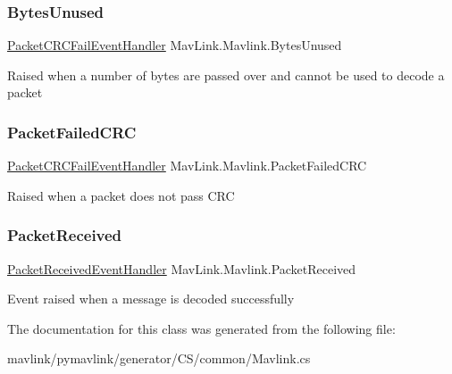 \subsubsection{\texorpdfstring{Bytes\+Unused}{BytesUnused}}
{\footnotesize\ttfamily \hyperlink{namespaceMavLink_a8ed8a6701876b63e5bb9135a9897d679}{Packet\+C\+R\+C\+Fail\+Event\+Handler} Mav\+Link.\+Mavlink.\+Bytes\+Unused}



Raised when a number of bytes are passed over and cannot be used to decode a packet 

\mbox{\label{classMavLink_1_1Mavlink_ac73a6b5c5f3ecd09964ec630225fabdd}} 
\subsubsection{\texorpdfstring{Packet\+Failed\+C\+RC}{PacketFailedCRC}}
{\footnotesize\ttfamily \hyperlink{namespaceMavLink_a8ed8a6701876b63e5bb9135a9897d679}{Packet\+C\+R\+C\+Fail\+Event\+Handler} Mav\+Link.\+Mavlink.\+Packet\+Failed\+C\+RC}



Raised when a packet does not pass C\+RC 

\mbox{\label{classMavLink_1_1Mavlink_ae5657dc889b9cbc7ce2c03d1cd5f7e73}} 
\subsubsection{\texorpdfstring{Packet\+Received}{PacketReceived}}
{\footnotesize\ttfamily \hyperlink{namespaceMavLink_a78c17c9f049257b0626c8d377735666d}{Packet\+Received\+Event\+Handler} Mav\+Link.\+Mavlink.\+Packet\+Received}



Event raised when a message is decoded successfully 



The documentation for this class was generated from the following file\+:\begin{DoxyCompactItemize}
\item 
mavlink/pymavlink/generator/\+C\+S/common/Mavlink.\+cs\end{DoxyCompactItemize}
